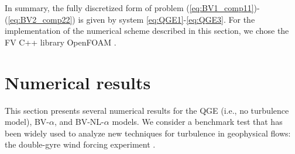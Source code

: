 \documentclass[11pt,a4paper]{article}
\begin{document}
In summary, the fully discretized form of problem  (\ref{eq:BV1_comp11})-(\ref{eq:BV2_comp22}) is given by system \eqref{eq:QGE1}-\eqref{eq:QGE3}.
For the implementation of the numerical scheme described in this section, we chose the FV C++ library OpenFOAM\textsuperscript{\textregistered} \cite{Weller1998}.


\section{Numerical results} \label{sec:results}

\begin{comment}
LISTA RISULTATI DA METTERE:
\begin{itemize}
\item Ro = 0.0036, Re = 450
\begin{itemize}
\item QGE su 256x512, QGE su 16x32 (da confrontare con Traian), QGE su 4x8, BV L su 4x8 e BV NL su 4x8
\item Energia cinetica su tutti i casi di cui sopra
\item funzione indicatrice media su BV NL 4x8
\end{itemize}
\begin{itemize}
\item QGE su 256x512, QGE su 16x32, QGE su 4x8, BV L su 16x32, BV L su 4x8, BV NL su 16x32, BV NL su 4x8
\item Energia cinetica su tutti i casi di cui sopra
\item funzione indicatrice media su BV NL 16x32 e su BV NL 4x8	
\end{itemize}

\end{itemize}
\end{comment}



This section presents several numerical results for the QGE (i.e., no turbulence model), BV-$\alpha$, and BV-NL-$\alpha$ models. 
We consider a benchmark test that has been widely used to analyze new techniques for turbulence in geophysical flows:
the double-gyre wind forcing experiment  \cite{Nadiga2001, Holm2003, Greathbatch2000, San2011, Monteiro2015, Monteiro2014}. 
\end{document}
